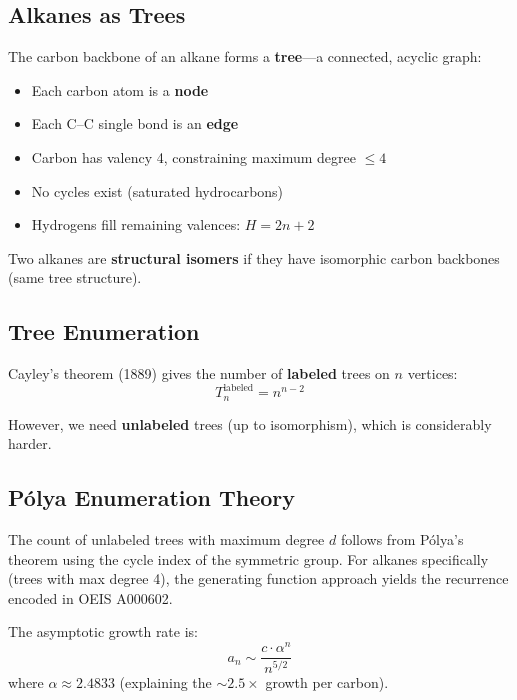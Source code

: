 \documentclass[conference]{IEEEtran}
\begin{document}
\subsection{Alkanes as Trees}

The carbon backbone of an alkane forms a \textbf{tree}---a connected, acyclic graph:

\begin{itemize}
    \item Each carbon atom is a \textbf{node}
    \item Each C--C single bond is an \textbf{edge}
    \item Carbon has valency 4, constraining maximum degree $\leq 4$
    \item No cycles exist (saturated hydrocarbons)
    \item Hydrogens fill remaining valences: $H = 2n + 2$
\end{itemize}

Two alkanes are \textbf{structural isomers} if they have isomorphic carbon backbones (same tree structure).

\subsection{Tree Enumeration}

Cayley's theorem (1889) gives the number of \textbf{labeled} trees on $n$ vertices:
\begin{equation}
T_n^{\text{labeled}} = n^{n-2}
\end{equation}

However, we need \textbf{unlabeled} trees (up to isomorphism), which is considerably harder.

\subsection{Pólya Enumeration Theory}

The count of unlabeled trees with maximum degree $d$ follows from Pólya's theorem using the cycle index of the symmetric group. For alkanes specifically (trees with max degree 4), the generating function approach yields the recurrence encoded in OEIS A000602.

The asymptotic growth rate is:
\begin{equation}
a_n \sim \frac{c \cdot \alpha^n}{n^{5/2}}
\end{equation}
where $\alpha \approx 2.4833$ (explaining the $\sim 2.5\times$ growth per carbon).
\end{document}
